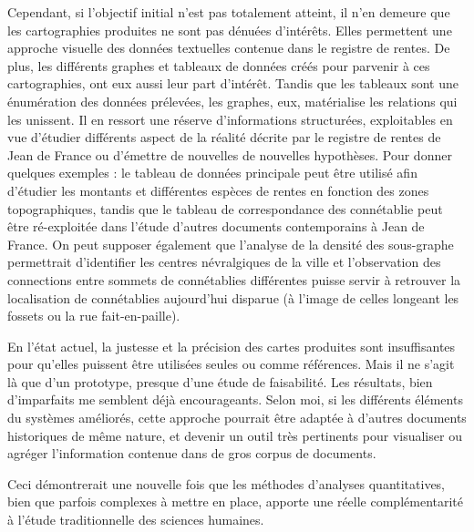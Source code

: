 Cependant, si l'objectif initial n'est pas totalement atteint, il n'en demeure que les cartographies produites ne sont pas dénuées d'intérêts. Elles permettent une approche visuelle des données textuelles contenue dans le registre de rentes. De plus, les différents graphes et tableaux de données créés pour parvenir à ces cartographies, ont eux aussi leur part d'intérêt. Tandis que les tableaux sont une énumération des données prélevées, les graphes, eux, matérialise les relations qui les unissent. Il en ressort une réserve d'informations structurées, exploitables en vue d'étudier différents aspect de la réalité décrite par le registre de rentes de Jean de France ou d'émettre de nouvelles de nouvelles hypothèses. Pour donner quelques exemples : le tableau de données principale peut être utilisé afin d'étudier les montants et différentes espèces de rentes en fonction des zones topographiques, tandis que le tableau de correspondance des connétablie  peut être ré-exploitée dans l'étude d'autres documents contemporains à Jean de France.
On peut supposer également que l'analyse de la densité des sous-graphe permettrait d'identifier les centres névralgiques de la ville et l'observation des connections entre sommets de connétablies différentes puisse servir à retrouver la localisation de connétablies  aujourd'hui disparue (à l'image de celles longeant les fossets ou la rue fait-en-paille).

En l'état actuel, la justesse et la précision des cartes produites sont insuffisantes pour qu'elles puissent être utilisées seules ou comme références.
Mais il ne s'agit là que d'un prototype, presque d'une étude de faisabilité. Les résultats, bien d'imparfaits me semblent déjà encourageants. Selon moi, si les différents éléments du systèmes améliorés, cette approche pourrait être adaptée à d'autres documents historiques de même nature, et devenir un outil très pertinents pour visualiser ou agréger l'information contenue dans de gros corpus de documents. 

Ceci démontrerait une nouvelle fois que les méthodes d'analyses quantitatives, bien que parfois complexes à mettre en place,  apporte une réelle complémentarité à l'étude traditionnelle des sciences humaines.